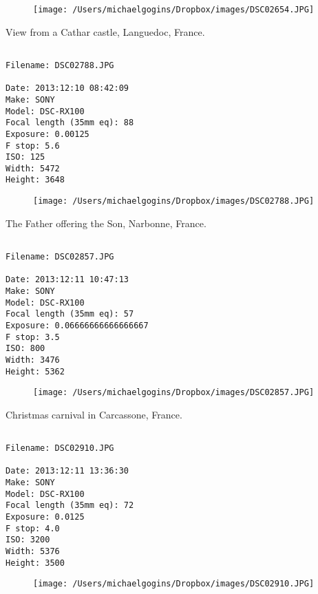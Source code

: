 \begin{figure}
\texttt{[image: /Users/michaelgogins/Dropbox/images/DSC02654.JPG]}
\end{figure}
    
\clearpage
\onecolumn
\noindent View from a Cathar castle, Languedoc, France.
\noindent
\begin{lstlisting}

Filename: DSC02788.JPG

Date: 2013:12:10 08:42:09
Make: SONY
Model: DSC-RX100
Focal length (35mm eq): 88
Exposure: 0.00125
F stop: 5.6
ISO: 125
Width: 5472
Height: 3648
\end{lstlisting}
\clearpage

\begin{figure}
\texttt{[image: /Users/michaelgogins/Dropbox/images/DSC02788.JPG]}
\end{figure}
    
\clearpage
\onecolumn
\noindent The Father offering the Son, Narbonne, France.
\noindent
\begin{lstlisting}

Filename: DSC02857.JPG

Date: 2013:12:11 10:47:13
Make: SONY
Model: DSC-RX100
Focal length (35mm eq): 57
Exposure: 0.06666666666666667
F stop: 3.5
ISO: 800
Width: 3476
Height: 5362
\end{lstlisting}
\clearpage

\begin{figure}
\texttt{[image: /Users/michaelgogins/Dropbox/images/DSC02857.JPG]}
\end{figure}
    
\clearpage
\onecolumn
\noindent Christmas carnival in Carcassone, France.
\noindent
\begin{lstlisting}

Filename: DSC02910.JPG

Date: 2013:12:11 13:36:30
Make: SONY
Model: DSC-RX100
Focal length (35mm eq): 72
Exposure: 0.0125
F stop: 4.0
ISO: 3200
Width: 5376
Height: 3500
\end{lstlisting}
\clearpage

\begin{figure}
\texttt{[image: /Users/michaelgogins/Dropbox/images/DSC02910.JPG]}
\end{figure}
    
